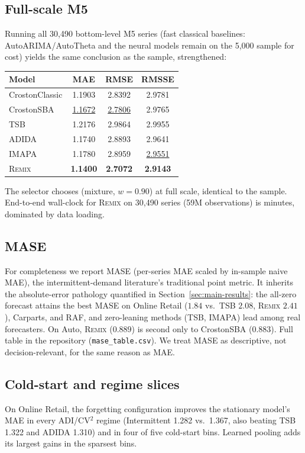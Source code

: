 \documentclass[twocolumn,10pt]{article}
\newcommand{\REMIX}{\textsc{Remix}}
\newcommand{\best}[1]{\textbf{#1}}
\newcommand{\secondbest}[1]{\underline{#1}}
\begin{document}
\subsection{Full-scale M5}
Running all 30{,}490 bottom-level M5 series (fast classical baselines:
AutoARIMA/AutoTheta and the neural models remain on the 5{,}000 sample
for cost) yields the same conclusion as the sample, strengthened:

\begin{table}[h]
\centering
\small
\begin{tabular}{lccc}
\toprule
Model & MAE & RMSE & RMSSE\\
\midrule
CrostonClassic & 1.1903 & 2.8392 & 2.9781\\
CrostonSBA & \secondbest{1.1672} & \secondbest{2.7806} & 2.9765\\
TSB & 1.2176 & 2.9864 & 2.9955\\
ADIDA & 1.1740 & 2.8893 & 2.9641\\
IMAPA & 1.1780 & 2.8959 & \secondbest{2.9551}\\
\REMIX{} & \best{1.1400} & \best{2.7072} & \best{2.9143}\\
\bottomrule
\end{tabular}
\end{table}

\noindent The selector chooses (mixture, $w{=}0.90$) at full scale,
identical to the sample. End-to-end wall-clock for \REMIX{} on 30{,}490
series (59M observations) is minutes, dominated by data loading.

\subsection{MASE}
For completeness we report MASE (per-series MAE scaled by in-sample
naive MAE), the intermittent-demand literature's traditional point
metric. It inherits the absolute-error pathology quantified in
Section~\ref{sec:main-results}: the all-zero forecast attains the best
MASE on Online Retail ($1.84$ vs.\ TSB $2.08$, \REMIX{} $2.41$),
Carparts, and RAF, and zero-leaning methods (TSB, IMAPA) lead among real
forecasters. On Auto, \REMIX{} ($0.889$) is second only to CrostonSBA
($0.883$). Full table in the repository
(\texttt{mase\_table.csv}). We treat MASE as descriptive, not
decision-relevant, for the same reason as MAE.

\subsection{Cold-start and regime slices}
On Online Retail, the forgetting configuration improves the stationary
model's MAE in every ADI/CV$^2$ regime (Intermittent 1.282 vs.\ 1.367,
also beating TSB 1.322 and ADIDA 1.310) and in four of five cold-start
bins. Learned pooling adds its largest gains in the sparsest bins.
\end{document}
